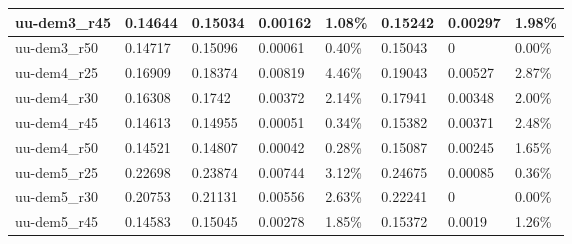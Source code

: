 \begin{table}[H]
\begin{tabular}{|l|l|l|l|l|l|l|l|}
    uu-dem3\_r45                                & 0.14644                                  & 0.15034                  & 0.00162                    & 1.08\%                  & 0.15242                  & 0.00297                    & 1.98\%                  \\ \hline
    uu-dem3\_r50                                & 0.14717                                  & 0.15096                  & 0.00061                    & 0.40\%                  & 0.15043                  & 0                          & 0.00\%                  \\ \hline
    uu-dem4\_r25                                & 0.16909                                  & 0.18374                  & 0.00819                    & 4.46\%                  & 0.19043                  & 0.00527                    & 2.87\%                  \\ \hline
    uu-dem4\_r30                                & 0.16308                                  & 0.1742                   & 0.00372                    & 2.14\%                  & 0.17941                  & 0.00348                    & 2.00\%                  \\ \hline
    uu-dem4\_r45                                & 0.14613                                  & 0.14955                  & 0.00051                    & 0.34\%                  & 0.15382                  & 0.00371                    & 2.48\%                  \\ \hline
    uu-dem4\_r50                                & 0.14521                                  & 0.14807                  & 0.00042                    & 0.28\%                  & 0.15087                  & 0.00245                    & 1.65\%                  \\ \hline
    uu-dem5\_r25                                & 0.22698                                  & 0.23874                  & 0.00744                    & 3.12\%                  & 0.24675                  & 0.00085                    & 0.36\%                  \\ \hline
    uu-dem5\_r30                                & 0.20753                                  & 0.21131                  & 0.00556                    & 2.63\%                  & 0.22241                  & 0                          & 0.00\%                  \\ \hline
    uu-dem5\_r45                                & 0.14583                                  & 0.15045                  & 0.00278                    & 1.85\%                  & 0.15372                  & 0.0019                     & 1.26\%                  \\ \hline

\end{tabular}
\end{table}
